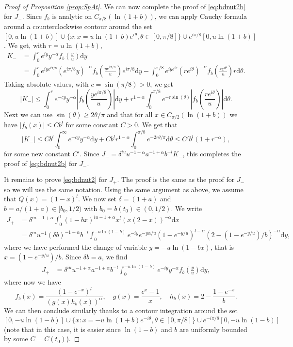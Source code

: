 \documentclass[10pt,a4paper]{amsart}
\renewcommand{\d}{\mathrm{d}}
\begin{document}
\begin{proof}[Proof of Proposition \ref{prop:SpAt}]
We can now complete the proof of \eqref{eq:bdnut2b} for $J_-$. Since  $f_b$ is analytic on $C_{\pi/8}  (\ln (1+b))$, we can apply Cauchy formula around a counterclockwise contour around the set $[0,u \ln (1+b)] \cup \{ x : x =  u \ln (1+b) e^{i \theta} , \theta \in [0,\pi/8]\} \cup e^{i \pi/8} [0,u \ln (1+b)]$. We get, with $r = u \ln (1+ b)$,
\begin{align*}
	K_- & = \int_{0}^{r} e^{iy} y^{-\alpha} f_b\left(\frac y u \right) \d y \\
	& = \int_{0}^{r} e^{iy  e^{i\pi/8}} ( e^{i\pi/8} y)^{-\alpha} f_b\left(\frac {y  e^{i\pi/8}}{ u}  \right) e^{i\pi/8}\d y -  \int_{0}^{\pi/8} e^{iy e^{i \theta} } (r e^{i\theta}) ^{-\alpha} f_b\left(\frac {r e^{i \theta}}{ u}  \right) r \d \theta.
\end{align*}
Taking absolute values, with $c = \sin (\pi/8) > 0$, we get 
$$
| K_- | \leq \int_{0}^{r} e^{-c y } y^{-\alpha} \left| f_b\left(\frac {y  e^{i\pi/8}}{ u}  \right)\right|  \d y + r^{1-\alpha} \int_{0}^{\pi/8} e^{- r \sin ( \theta) }  \left|f_b\left(\frac {r e^{i \theta}}{ u}  \right)\right|  \d \theta.
$$
Next we can use $\sin(\theta ) \geq 2 \theta / \pi$ and that for all $x \in C_{\pi/2}( \ln(1+b))$ we have $|f_b(x)| \leq C b^l$  for some constant $C > 0$. We get that
$$
| K_- | \leq C  b^l \int_0^\infty e^{-cy} y^{-\alpha} \d y + C b^l r^{1-\alpha}  \int_{0}^{\pi/8} e^{- 2 r \theta / \pi } \d\theta \leq C' b^l ( 1+ r^{-\alpha}),  
$$
for some new constant $C'$. Since $J_- = \delta^{iu} u^{-1+\alpha} a^{-1 + \alpha } b ^{-l} K_-$, this completes the proof of \eqref{eq:bdnut2b} for $J_-$. 


It remains to prove \eqref{eq:bdnut2} for $J_+$. The proof is the same as the proof for $J_-$ so we will use the same notation. Using the same argument as above, we assume that $Q(x) = (1-x)^l$. We now set  $\delta = (1+a)$ and $b = a / (1 + a) \in [b_0,1/2)$ with $b _0 = b(t_0) \in (0,1/2)$. We write 
\begin{align*}
	J_+ &=  \delta^{iu - 1 + \alpha} \int_{0}^{1} ( 1 - b x )^{iu - 1 + \alpha} x^l ( x(2- x))^{ -\alpha } \d x  \\
	& = \delta^{iu} u^{-1} (\delta b)^{-1 + \alpha } b ^{-l} \int_{0}^{- u \ln (1 - b)} e^{-iy } e^{-y \alpha / u }  (1-e^{-y/u})^{l - \alpha}  (2-(1 - e^{-y/u})/b )^{- \alpha } \d y,
\end{align*}
where we have performed the change of variable $y =  - u \ln ( 1 - bx)$, that is $x = (1 - e^{-y/u})/b$. Since $\delta b = a$, we find
\begin{align*}
	J_+ 
	& = \delta^{iu} u^{-1+\alpha} a^{-1 + \alpha } b ^{-l} \int_{0}^{- u \ln (1 - b)} e^{-iy} y^{-\alpha} f_b\left(\frac y u \right) \d y,
\end{align*}
where now we have
$$
f_b(x) =  \frac{(1-e^{-x})^{l} }{ \left( g(x)  h_b(x) \right)^{\alpha} }, \quad g(x) =  \frac{e^{x} -1 }{x} , \quad h_b(x) =  2 - \frac{1- e^{-x}}{b}.
$$		
We can then conclude similarly thanks to a contour integration around the set $[0, - u \ln (1 - b)] \cup \{ x : x =  -u \ln (1+b) e^{ - i \theta} , \theta \in [0,\pi/8]\} \cup e^{ - i \pi/8} [0, - u \ln (1-b)]$ (note that in this case, it is easier since $\ln (1-b) $ and $b$ are uniformly bounded by some $C = C(t_0)$). 
\end{proof}
\end{document}
